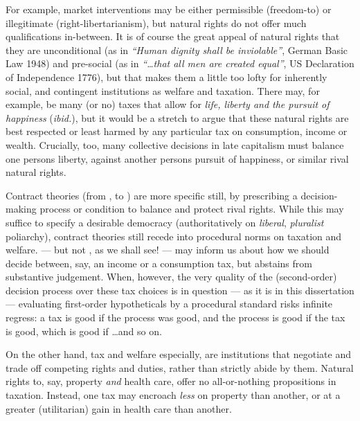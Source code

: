 \begin{description}
	For example, market interventions may be either permissible (freedom-to) or illegitimate (right-libertarianism), but natural rights do not offer much qualifications in-between.
	It is of course the great appeal of natural rights that they are unconditional (as in \emph{``Human dignity shall be inviolable''}, German Basic Law 1948) and pre-social (as in \emph{``\ldots that all men are created equal''}, US Declaration of Independence 1776), but that makes them a little too lofty for inherently social, and contingent institutions as welfare and taxation.
	There may, for example, be many (or no) taxes that allow for \emph{life, liberty and the pursuit of happiness} (\emph{ibid.}), but it would be a stretch to argue that these natural rights are best respected or least harmed by any particular tax on consumption, income or wealth.
	Crucially, too, many collective decisions in late capitalism must balance one persons liberty, against another persons pursuit of happiness, or similar rival natural rights.

	Contract theories (from \citeauthor{Hobbes-1651-aa}, \citeauthor{Rousseau1762} to \citealt{Rawls-1971}) are more specific still, by prescribing a decision-making process or condition to balance and protect rival rights.
	While this may suffice to specify a desirable democracy (authoritatively \citealt{Dahl-1989-aa} on \emph{liberal}, \emph{pluralist} poliarchy), contract theories still recede into procedural norms on taxation and welfare.
	\citeauthor{Dahl-1989-aa} --- but not \citeauthor{Rawls-1971}, as we shall see! --- may inform us about how we should decide between, say, an income or a consumption tax, but abstains from substantive judgement.
	When, however, the very quality of the (second-order) decision process over these tax choices is in question --- as it is in this dissertation --- evaluating first-order hypotheticals by a procedural standard risks infinite regress:
	a tax is good if the process was good, and the process is good if the tax is good, which is good if \ldots and so on.

	On the other hand, tax and welfare especially, are institutions that negotiate and trade off competing rights and duties, rather than strictly abide by them.
	Natural rights to, say, property \emph{and} health care, offer no all-or-nothing propositions in taxation.
	Instead, one tax may encroach \emph{less} on property than another, or at a greater (utilitarian) gain in health care than another.


\end{description}
